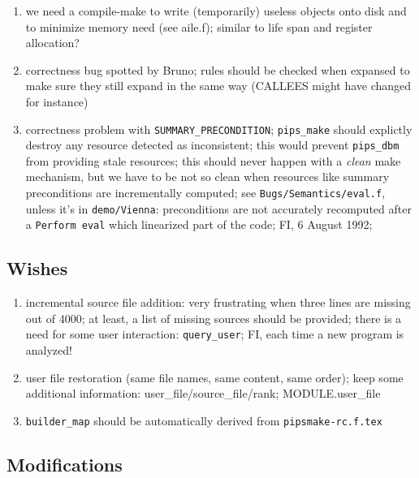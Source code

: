 \begin{enumerate}
  \item we need a compile-make to write (temporarily) useless objects
        onto disk and to minimize memory need (see aile.f); similar to
        life span and register allocation?

  \item correctness bug spotted by Bruno; rules should be checked when expansed
        to make sure they still expand in the same way (CALLEES might have
        changed for instance)

  \item correctness problem with \verb+SUMMARY_PRECONDITION+; \verb+pips_make+
        should explictly destroy any resource detected as inconsistent; this
        would prevent \verb+pips_dbm+ from providing stale resources; this
        should never happen with a {\em clean} make mechanism, but we have
        to be not so clean when resources like summary preconditions are
        incrementally computed; see \verb+Bugs/Semantics/eval.f+, unless
        it's in \verb+demo/Vienna+: preconditions are not accurately recomputed
        after a \verb+Perform eval+ which linearized part of the code;
        FI, 6 August 1992;

\end{enumerate}

\subsection{Wishes}

\begin{enumerate}

  \item incremental source file addition: very frustrating when three
        lines are missing out of 4000; at least, a list of missing sources
        should be provided; there is a need for some user interaction:
        \verb+query_user+; FI, each time a new program is analyzed!

  \item user file restoration (same file names, same content, same order);
        keep some additional information: user\_file/source\_file/rank;
        MODULE.user\_file

  \item \verb+builder_map+ should be automatically derived from
        \verb+pipsmake-rc.f.tex+

\end{enumerate}

\subsection{Modifications}

